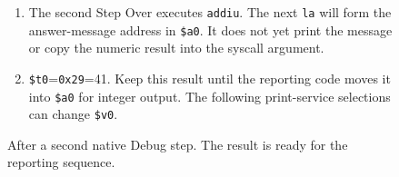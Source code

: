 \begin{figure}[htbp]
  \par\smallskip
  \begin{minipage}{\linewidth}
    \small
    \begin{enumerate}
      \item The second Step Over executes \texttt{addiu}. The next \texttt{la} will form the answer-message address in \texttt{\$a0}. It does not yet print the message or copy the numeric result into the syscall argument.
      \item \texttt{\$t0}=\texttt{0x29}=41. Keep this result until the reporting code moves it into \texttt{\$a0} for integer output. The following print-service selections can change \texttt{\$v0}.
    \end{enumerate}
  \end{minipage}
  \caption{After a second native Debug step. The result is ready for the reporting sequence.}
  \label{capture:001-console-calculation-f05-after-one}
\end{figure}
